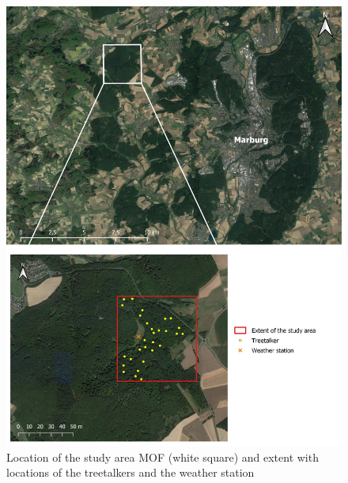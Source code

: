 \documentclass[5p]{elsarticle} %
\begin{document}
\graphicspath{ {./figures/} }

\begin{figure}[t]
\begin{center}
\includegraphics[scale=0.8]{study_area}
\caption{Location of the study area MOF (white square) and extent with locations of the treetalkers and the weather station}
\end{center}
\end{figure}
\end{document}

